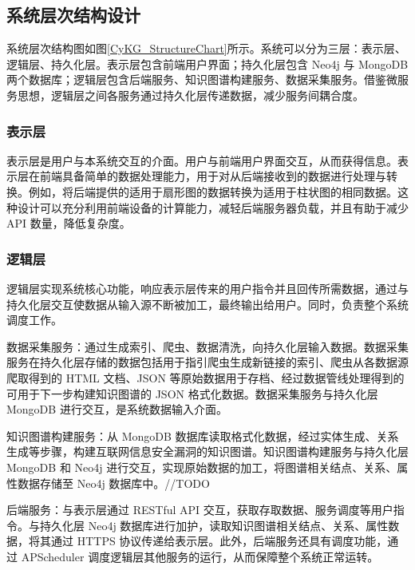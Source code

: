 \documentclass[a4paper,AutoFakeBold,oneside,12pt]{book}
\begin{document}
\subsection{系统层次结构设计}

系统层次结构图如图\ref{CyKG_StructureChart}所示。系统可以分为三层：表示层、逻辑层、持久化层。表示层包含前端用户界面；持久化层包含 Neo4j 与 MongoDB 两个数据库；逻辑层包含后端服务、知识图谱构建服务、数据采集服务。借鉴微服务思想，逻辑层之间各服务通过持久化层传递数据，减少服务间耦合度。


\subsubsection{表示层}

表示层是用户与本系统交互的介面。用户与前端用户界面交互，从而获得信息。表示层在前端具备简单的数据处理能力，用于对从后端接收到的数据进行处理与转换。例如，将后端提供的适用于扇形图的数据转换为适用于柱状图的相同数据。这种设计可以充分利用前端设备的计算能力，减轻后端服务器负载，并且有助于减少 API 数量，降低复杂度。

\subsubsection{逻辑层}

逻辑层实现系统核心功能，响应表示层传来的用户指令并且回传所需数据，通过与持久化层交互使数据从输入源不断被加工，最终输出给用户。同时，负责整个系统调度工作。

数据采集服务：通过生成索引、爬虫、数据清洗，向持久化层输入数据。数据采集服务在持久化层存储的数据包括用于指引爬虫生成新链接的索引、爬虫从各数据源爬取得到的 HTML 文档、JSON 等原始数据用于存档、经过数据管线处理得到的可用于下一步构建知识图谱的 JSON 格式化数据。数据采集服务与持久化层 MongoDB 进行交互，是系统数据输入介面。

知识图谱构建服务：从 MongoDB 数据库读取格式化数据，经过实体生成、关系生成等步骤，构建互联网信息安全漏洞的知识图谱。知识图谱构建服务与持久化层 MongoDB 和 Neo4j 进行交互，实现原始数据的加工，将图谱相关结点、关系、属性数据存储至 Neo4j 数据库中。//TODO

后端服务：与表示层通过 RESTful API 交互，获取存取数据、服务调度等用户指令。与持久化层 Neo4j 数据库进行加护，读取知识图谱相关结点、关系、属性数据，将其通过 HTTPS 协议传递给表示层。此外，后端服务还具有调度功能，通过 APScheduler 调度逻辑层其他服务的运行，从而保障整个系统正常运转。
\end{document}

